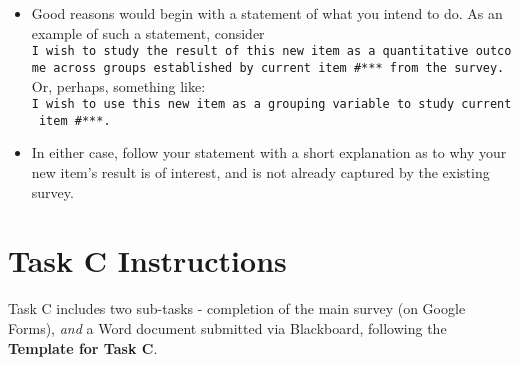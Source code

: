 \documentclass[]{book}
\providecommand{\tightlist}{%
  \setlength{\itemsep}{0pt}\setlength{\parskip}{0pt}}
\theoremstyle{definition}
\theoremstyle{definition}
\theoremstyle{definition}
\theoremstyle{remark}
\begin{document}
\begin{enumerate}
\begin{itemize}
\begin{enumerate}
      \begin{itemize}
      \tightlist
      \item
        Good reasons would begin with a statement of what you intend to
        do. As an example of such a statement, consider
        \texttt{I\ wish\ to\ study\ the\ result\ of\ this\ new\ item\ as\ a\ quantitative\ outcome\ across\ groups\ established\ by\ current\ item\ \#***\ from\ the\ survey.}
        Or, perhaps, something like:
        \texttt{I\ wish\ to\ use\ this\ new\ item\ as\ a\ grouping\ variable\ to\ study\ current\ item\ \#***.}
      \item
        In either case, follow your statement with a short explanation
        as to why your new item's result is of interest, and is not
        already captured by the existing survey.
      \end{itemize}
    \end{enumerate}
  \end{itemize}
\end{enumerate}

\hypertarget{task-c-instructions}{%
\chapter{Task C Instructions}\label{task-c-instructions}}

Task C includes two sub-tasks - completion of the main survey (on Google
Forms), \emph{and} a Word document submitted via Blackboard, following
the \textbf{Template for Task C}.
\end{document}
